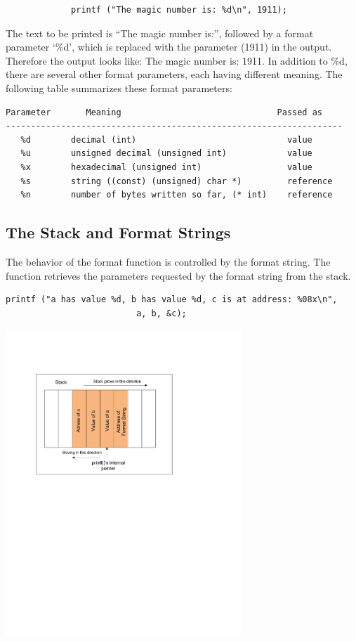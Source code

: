 \begin{verbatim}
             printf ("The magic number is: %d\n", 1911);
\end{verbatim}

The text to be printed is ``The magic number is:'', followed by a format
parameter `\%d', which is replaced with the parameter (1911) in the output.
Therefore the output looks like: The magic number is: 1911. In addition to
\%d,
there are several other format parameters, each having different meaning.
The
following table summarizes these format parameters:
\begin{Verbatim}[frame=single]
Parameter       Meaning                               Passed as
-------------------------------------------------------------------
   %d        decimal (int)                              value
   %u        unsigned decimal (unsigned int)            value
   %x        hexadecimal (unsigned int)                 value
   %s        string ((const) (unsigned) char *)         reference
   %n        number of bytes written so far, (* int)    reference
\end{Verbatim}

\subsection{The Stack and Format Strings}


The behavior of the format function is controlled by the format string.
The function retrieves the parameters requested by the format string
from the stack.

\begin{Verbatim}[frame=single]
printf ("a has value %d, b has value %d, c is at address: %08x\n", 
                          a, b, &c);
\end{Verbatim}


\begin{center}
\includegraphics*[viewport=1.10in 5.70in 6.1in 9.5in,width=3.5in,natwidth=621,natheight=403]{Figs/Format_String_Stack.pdf}
\end{center}


